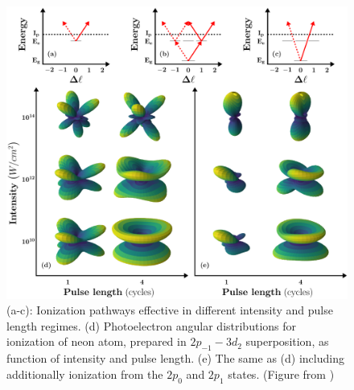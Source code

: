 \begin{figure}[!ht]
\begin{center}
    \includegraphics[width=0.9\linewidth]{figs/Photo_ionization/GAP/combine_fig_1.pdf}
\end{center}
\caption{
(a-c): Ionization pathways effective in different intensity and pulse length regimes. (d) Photoelectron angular distributions for ionization of neon atom, prepared in $2p_{-1}-3d_2$ superposition, as function of intensity and pulse length. (e) The same as (d) including additionally ionization from the $2p_0$ and $2p_1$ states. (Figure from \cite{venzke2020_GAP})
} 
  \label{fig:scheme_GAP_lin}
\end{figure}

